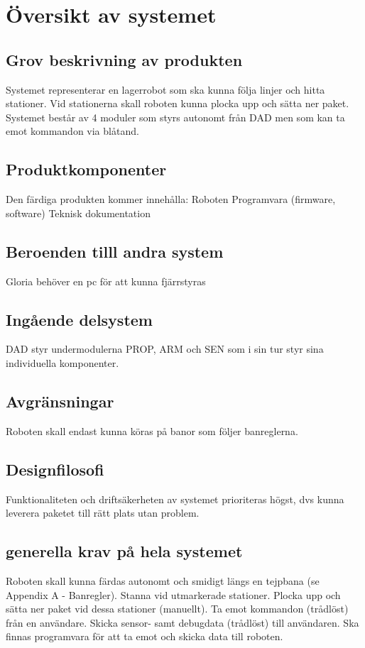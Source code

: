 \section{Översikt av systemet}

\subsection{Grov beskrivning av produkten}
Systemet representerar en lagerrobot som ska kunna följa linjer och hitta stationer. Vid stationerna skall roboten kunna plocka upp och sätta ner paket. Systemet består av 4 moduler som styrs autonomt från DAD men som kan ta emot kommandon via blåtand.

\subsection{Produktkomponenter}
Den färdiga produkten kommer innehålla:
Roboten
Programvara (firmware, software)
Teknisk dokumentation

\subsection{Beroenden tilll andra system}
Gloria behöver en pc för att kunna fjärrstyras


\subsection{Ingående delsystem}
DAD styr undermodulerna PROP, ARM och SEN som i sin tur styr sina individuella komponenter.

\subsection{Avgränsningar}
Roboten skall endast kunna köras på banor som följer banreglerna.

\subsection{Designfilosofi}
Funktionaliteten och driftsäkerheten av systemet prioriteras högst, dvs kunna leverera paketet till rätt plats utan problem.

\subsection{generella krav på hela systemet}
Roboten skall kunna färdas autonomt och smidigt längs en tejpbana (se Appendix A - Banregler).
Stanna vid utmarkerade stationer.
Plocka upp och sätta ner paket vid dessa stationer (manuellt).
Ta emot kommandon (trådlöst) från en användare.
Skicka sensor- samt debugdata (trådlöst) till användaren.
Ska finnas programvara för att ta emot och skicka data till roboten.